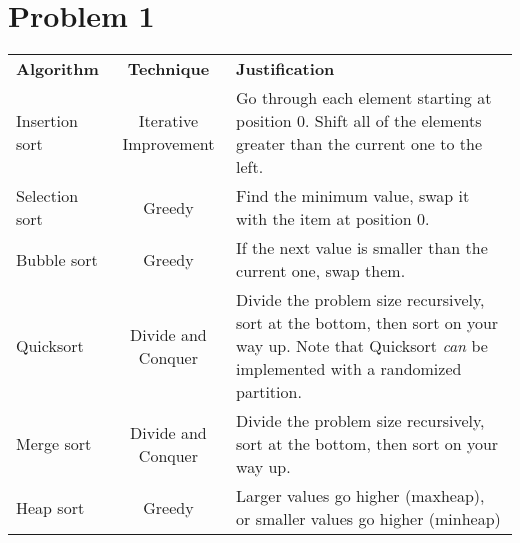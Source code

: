 \section*{Problem 1}

\begin{tabular}{l c p{6cm}}
    \textbf{Algorithm} & \textbf{Technique} & \textbf{Justification} \\
    Insertion sort & Iterative Improvement & Go through each element starting at position 0. Shift all of the elements greater than the current one to the left.\\
    Selection sort & Greedy & Find the minimum value, swap it with the item at position 0.\\
    Bubble sort & Greedy & If the next value is smaller than the current one, swap them.\\
    Quicksort & Divide and Conquer & Divide the problem size recursively, sort at the bottom, then sort on your way up. Note that Quicksort \textit{can} be implemented with a randomized partition.\\
    Merge sort & Divide and Conquer & Divide the problem size recursively, sort at the bottom, then sort on your way up.\\
    Heap sort & Greedy & Larger values go higher (maxheap), or smaller values go higher (minheap)\\
\end{tabular}